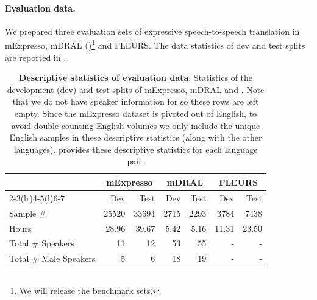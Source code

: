 \paragraph{Evaluation data.} We prepared three evaluation sets of expressive speech-to-speech translation in mExpresso, mDRAL ()\footnote{We will release the benchmark sets.} and FLEURS. The data statistics of dev and test splits are reported in .

\begin{table}[htbp!]
    \small
    \centering
    \begin{tabular}{lrrrrrr}
        \toprule
         & \multicolumn{2}{c}{\textbf{mExpresso}} & \multicolumn{2}{c}{\textbf{mDRAL}} & \multicolumn{2}{c}{\textbf{FLEURS}}  \\ \cmidrule(r){2-3}\cmidrule(lr){4-5}\cmidrule(l){6-7}
         & Dev & Test & Dev & Test & Dev & Test \\ \midrule
        Sample \#              & 25520 &  33694  & 2715 & 2293 & 3784 & 7438  \\
        Hours                  & 28.96 & 39.67   & 5.42 & 5.16 & 11.31  & 23.50 \\
        Total \# Speakers      & 11    & 12      & 53 & 55 & - & - \\
        Total \# Male Speakers & 5     & 6       & 18    & 19 & -  & - \\
         \hline
    \end{tabular}
    \caption{\textbf{Descriptive statistics of evaluation data}. Statistics of the development (dev) and test splits of mExpresso, mDRAL and \fleurs. Note that we do not have speaker information for \fleurs so these rows are left empty. Since the mExpresso dataset is pivoted out of English, to avoid double counting English volumes we only include the unique English samples in these descriptive statistics (along with the other languages).    provides these descriptive statistics for each language pair.}
    \label{tab:expressive_dev_test_data}
\end{table}







